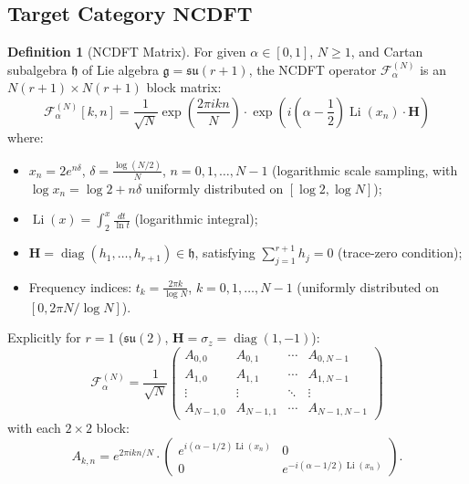 \documentclass[12pt,a4paper]{amsart}
\theoremstyle{plain}
\theoremstyle{definition}
\newtheorem{definition}[theorem]{Definition}
\theoremstyle{remark}
\DeclareMathOperator{\Li}{Li}
\DeclareMathOperator{\diag}{diag}
\begin{document}
\subsection{Target Category $\mathbf{NCDFT}$}

\begin{definition}[NCDFT Matrix]\label{def:ncdft}
For given $\alpha \in [0,1]$, $N \geq 1$, and Cartan subalgebra $\mathfrak{h}$ of Lie algebra $\mathfrak{g} = \mathfrak{su}(r+1)$, the NCDFT operator $\mathcal{F}_\alpha^{(N)}$ is an $N(r+1) \times N(r+1)$ block matrix:
\begin{equation}
\mathcal{F}_\alpha^{(N)}[k,n] = \frac{1}{\sqrt{N}} \exp\left(\frac{2\pi i k n}{N}\right) \cdot \exp\left(i\left(\alpha - \frac{1}{2}\right) \Li(x_n) \cdot \mathbf{H}\right)
\end{equation}
where:
\begin{itemize}
    \item $x_n = 2e^{n\delta}$, $\delta = \frac{\log(N/2)}{N}$, $n=0,1,\dots,N-1$ (logarithmic scale sampling, with $\log x_n = \log 2 + n\delta$ uniformly distributed on $[\log 2, \log N]$);
    \item $\Li(x) = \int_2^x \frac{dt}{\ln t}$ (logarithmic integral);
    \item $\mathbf{H} = \diag(h_1, \dots, h_{r+1}) \in \mathfrak{h}$, satisfying $\sum_{j=1}^{r+1} h_j = 0$ (trace-zero condition);
    \item Frequency indices: $t_k = \frac{2\pi k}{\log N}$, $k = 0, 1, \dots, N-1$ (uniformly distributed on $[0, 2\pi N/\log N]$).
\end{itemize}
\end{definition}

Explicitly for $r=1$ ($\mathfrak{su}(2)$, $\mathbf{H}=\sigma_z=\diag(1,-1)$):
\begin{equation}
\mathcal{F}_\alpha^{(N)} = \frac{1}{\sqrt{N}} \begin{pmatrix} 
A_{0,0} & A_{0,1} & \cdots & A_{0,N-1} \\
A_{1,0} & A_{1,1} & \cdots & A_{1,N-1} \\
\vdots & \vdots & \ddots & \vdots \\
A_{N-1,0} & A_{N-1,1} & \cdots & A_{N-1,N-1}
\end{pmatrix}
\end{equation}
with each $2 \times 2$ block:
\begin{equation}
A_{k,n} = e^{2\pi i k n/N} \cdot \begin{pmatrix} 
e^{i(\alpha-1/2)\Li(x_n)} & 0 \\
0 & e^{-i(\alpha-1/2)\Li(x_n)}
\end{pmatrix}.
\end{equation}
\end{document}
